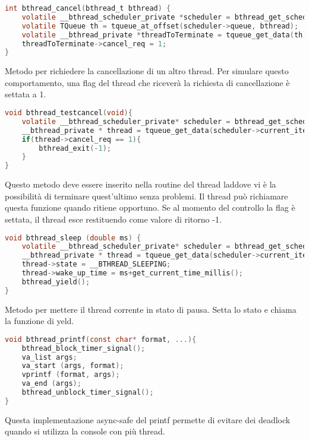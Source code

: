 \documentclass{article}
\begin{document}
\begin{lstlisting}[language=C]
int bthread_cancel(bthread_t bthread) {
    volatile __bthread_scheduler_private *scheduler = bthread_get_scheduler();
    volatile TQueue th = tqueue_at_offset(scheduler->queue, bthread);
    volatile __bthread_private *threadToTerminate = tqueue_get_data(th);
    threadToTerminate->cancel_req = 1;
}
\end{lstlisting}

Metodo per richiedere la cancellazione di un altro thread. Per simulare questo comportamento, una flag del thread che riceverà la richiesta di cancellazione è settata a 1.

\begin{lstlisting}[language=C]
void bthread_testcancel(void){
    volatile __bthread_scheduler_private* scheduler = bthread_get_scheduler();
    __bthread_private * thread = tqueue_get_data(scheduler->current_item);
    if(thread->cancel_req == 1){
        bthread_exit(-1);
    }
}
\end{lstlisting}

Questo metodo deve essere inserito nella routine del thread laddove vi è la possibilità di terminare quest'ultimo senza problemi. Il thread può richiamare questa funzione quando ritiene opportuno. Se al momento del controllo la flag è settata, il thread esce restituendo come valore di ritorno -1.

\begin{lstlisting}[language=C]
void bthread_sleep (double ms) {
    volatile __bthread_scheduler_private* scheduler = bthread_get_scheduler();
    __bthread_private * thread = tqueue_get_data(scheduler->current_item);
    thread->state = __BTHREAD_SLEEPING;
    thread->wake_up_time = ms+get_current_time_millis();
    bthread_yield();
}
\end{lstlisting}

Metodo per mettere il thread corrente in stato di pausa. Setta lo stato e chiama la funzione di yeld.

\begin{lstlisting}[language=C]
void bthread_printf(const char* format, ...){
    bthread_block_timer_signal();
    va_list args;
    va_start (args, format);
    vprintf (format, args);
    va_end (args);
    bthread_unblock_timer_signal();
}
\end{lstlisting}

Questa implementazione async-safe del printf permette di evitare dei deadlock quando si utilizza la console con più thread.
\vspace{2mm}
\end{document}
